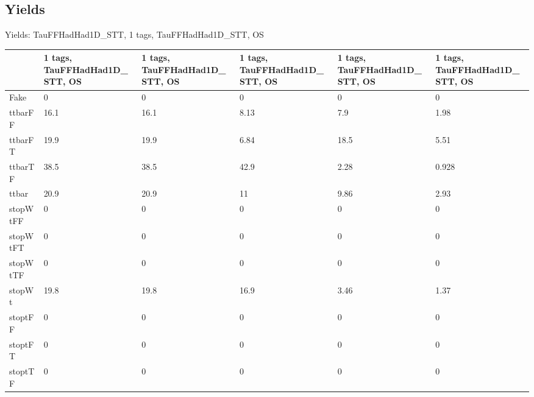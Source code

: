 
\subsection{Yields}

\begin{frame}{Yields: TauFFHadHad1D\_STT, 1 tags, TauFFHadHad1D\_STT, OS}
\begin{center}
  \begin{tabular}{l| >{\centering\let\newline\\\arraybackslash\hspace{0pt}}m{1.4cm}| >{\centering\let\newline\\\arraybackslash\hspace{0pt}}m{1.4cm}| >{\centering\let\newline\\\arraybackslash\hspace{0pt}}m{1.4cm}| >{\centering\let\newline\\\arraybackslash\hspace{0pt}}m{1.4cm}| >{\centering\let\newline\\\arraybackslash\hspace{0pt}}m{1.4cm}}
    & 1 tags, TauFFHadHad1D\_STT, OS & 1 tags, TauFFHadHad1D\_STT, OS & 1 tags, TauFFHadHad1D\_STT, OS & 1 tags, TauFFHadHad1D\_STT, OS & 1 tags, TauFFHadHad1D\_STT, OS \\
 \hline \hline
    Fake& 0 & 0 & 0 & 0 & 0 \\
 \hline
    ttbarFF& 16.1 & 16.1 & 8.13 & 7.9 & 1.98 \\
 \hline
    ttbarFT& 19.9 & 19.9 & 6.84 & 18.5 & 5.51 \\
 \hline
    ttbarTF& 38.5 & 38.5 & 42.9 & 2.28 & 0.928 \\
 \hline
    ttbar& 20.9 & 20.9 & 11 & 9.86 & 2.93 \\
 \hline
    stopWtFF& 0 & 0 & 0 & 0 & 0 \\
 \hline
    stopWtFT& 0 & 0 & 0 & 0 & 0 \\
 \hline
    stopWtTF& 0 & 0 & 0 & 0 & 0 \\
 \hline
    stopWt& 19.8 & 19.8 & 16.9 & 3.46 & 1.37 \\
 \hline
    stoptFF& 0 & 0 & 0 & 0 & 0 \\
 \hline
    stoptFT& 0 & 0 & 0 & 0 & 0 \\
 \hline
    stoptTF& 0 & 0 & 0 & 0 & 0 \\

\end{tabular}
\end{center}
\end{frame}
